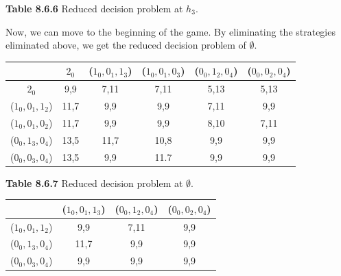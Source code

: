\documentclass{article}
\begin{document}
\begin{description}
\begin{center}
        {\bf Table 8.6.6} Reduced decision problem at $h_3$.
    \end{center}

    Now, we can move to the beginning of the game. By eliminating the strategies eliminated above, we get the reduced decision problem of $\emptyset$.
    \begin{center}
        \begin{tabular}{cccccc}
        \hline
        \hline
                   &          $2_0$ &  ($1_0, 0_1, 1_3$) &  ($1_0, 0_1, 0_3$) &  ($0_0, 1_2, 0_4$) &  ($0_0, 0_2, 0_4$) \\
        \hline
                 $2_0$ &        9,9 &       7,11 &       7,11 &       5,13 &       5,13 \\

         ($1_0, 0_1, 1_2$) &       11,7 &        9,9 &        9,9 &       7,11 &        9,9 \\

         ($1_0, 0_1, 0_2$) &       11,7 &        9,9 &        9,9 &       8,10 &       7,11 \\

         ($0_0, 1_3, 0_4$) &       13,5 &       11,7 &       10,8 &        9,9 &        9,9 \\

         ($0_0, 0_3, 0_4$) &       13,5 &        9,9 &       11.7 &        9,9 &        9,9 \\
        \hline
        \end{tabular}

         {\bf Table 8.6.7} Reduced decision problem at $\emptyset$.
    \end{center}


    \begin{center}
        \begin{tabular}{cccc}
        \hline
        \hline
                   &  ($1_0, 0_1, 1_3$) &  ($0_0, 1_2, 0_4$) &   ($0_0, 0_2, 0_4$) \\
        \hline
         ($1_0, 0_1, 1_2$) &        9,9 &       7,11 &        9,9 \\

         ($0_0, 1_3, 0_4$) &       11,7 &        9,9 &        9,9 \\

         ($0_0, 0_3, 0_4$) &        9,9 &        9,9 &        9,9 \\
        \hline
        \end{tabular}


\end{center}
\end{description}
\end{document}
